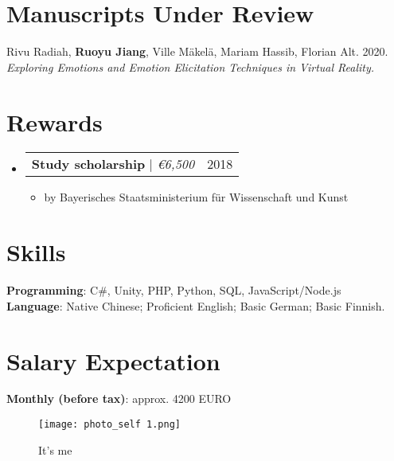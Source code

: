 \documentclass[letterpaper,11pt]{article}
\makeatletter
\newcommand{\resumeItem}[1]{
  \item\small{
    {#1 \vspace{-2pt}}
  }
}
\newcommand{\resumeProjectHeading}[2]{
    \item
    \begin{tabular*}{0.97\textwidth}{l@{\extracolsep{\fill}}r}
      \small#1 & #2 \\
    \end{tabular*}\vspace{-7pt}
}
\newcommand{\resumeSubHeadingListStart}{\begin{itemize}[leftmargin=0.15in, label={}]}
\newcommand{\resumeSubHeadingListEnd}{\end{itemize}}
\newcommand{\resumeItemListStart}{\begin{itemize}}
\newcommand{\resumeItemListEnd}{\end{itemize}\vspace{-5pt}}
\makeatother
\begin{document}
  
\section{Manuscripts Under Review}
    {Rivu Radiah, \textbf{Ruoyu Jiang}, Ville Mäkelä, Mariam Hassib, Florian Alt. 2020. \textit{Exploring Emotions and Emotion Elicitation Techniques in Virtual Reality.}}
  
  
\section{Rewards}
    \resumeSubHeadingListStart
      \resumeProjectHeading
          {\textbf{Study scholarship} $|$ \emph{\euro 6,500}}{2018}
          \resumeItemListStart
            \resumeItem{by Bayerisches Staatsministerium für Wissenschaft und Kunst}
          \resumeItemListEnd
    \resumeSubHeadingListEnd

%
\section{Skills}
 \begin{itemize}[leftmargin=0.15in, label={}]
    \small{\item{
     \textbf{Programming}{: C\#, Unity, PHP, Python, SQL, JavaScript/Node.js } \\
     \textbf{Language}{: Native Chinese; Proficient English; Basic German; Basic Finnish.}
    }}
 \end{itemize}


 \section{Salary Expectation}
 \begin{itemize}[leftmargin=0.15in, label={}]
    \small{\item{
     \textbf{Monthly (before tax)}{: approx. 4200 EURO }
    }}
 \end{itemize}

 \begin{figure}[h]
  \texttt{[image: photo\_self 1.png]}
  \centering
  \caption{It's me}
\end{figure}

\end{document}
